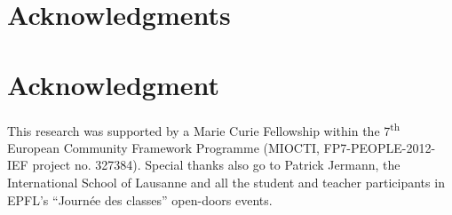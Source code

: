 \documentclass[10pt,journal,compsoc]{IEEEtran}
\begin{document}
\ifCLASSOPTIONcompsoc
  \section*{Acknowledgments}
\else
  \section*{Acknowledgment}
\fi

This research was supported by a Marie Curie Fellowship within the 7\textsuperscript{th} European Community Framework Programme (MIOCTI, FP7-PEOPLE-2012-IEF project no. 327384). Special thanks also go to Patrick Jermann, the International School of Lausanne and all the student and teacher participants in EPFL's ``Journ\'ee des classes'' open-doors events.



\ifCLASSOPTIONcaptionsoff
  \newpage
\fi







%
%
\end{document}
